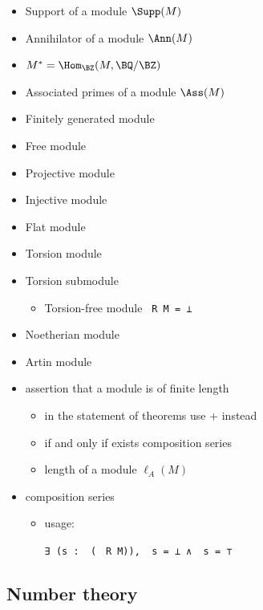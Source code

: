 \begin{itemize}
\item
Support of a module $\Supp(M)$ 
\item
Annihilator of a module $\Ann(M)$ 
\item
$M^*=\Hom_\BZ(M,\BQ/\BZ)$ 
\item
Associated primes of a module $\Ass(M)$ 
\item
Finitely generated module 
\item
Free module 
\item
Projective module 
\item
Injective module 
\item
Flat module 
\item
Torsion module 
\item
Torsion submodule 
\begin{itemize}
\item
Torsion-free module \verb| R M = ⊥|
\end{itemize}
\item
Noetherian module 
\item
Artin module 
\item
assertion that a module is of finite length 
\begin{itemize}
\item
in the statement of theorems use  +  instead
\item
if and only if exists composition series
\item
length of a module $\ell_A(M)$ 
\end{itemize}
\item
composition series 
\begin{itemize}
\item
usage:

\verb|∃ (s : |\verb| (|%
\verb| R M)), |\verb| s = ⊥ ∧ |\verb| s = ⊤|
\end{itemize}
\end{itemize}

\subsection{Number theory}

